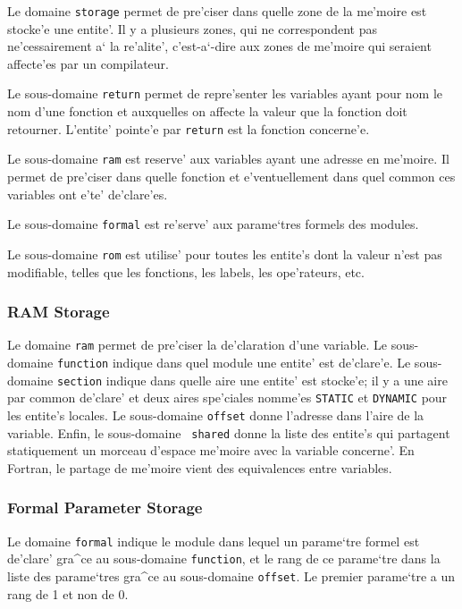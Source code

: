 {
Le domaine \verb/storage/ permet de pre'ciser dans quelle zone de la
me'moire est stocke'e une entite'. Il y a plusieurs zones, qui ne
correspondent pas ne'cessairement a` la re'alite', c'est-a`-dire aux
zones de me'moire qui seraient affecte'es par un compilateur.

Le sous-domaine \verb/return/ permet de repre'senter les variables ayant
pour nom le nom d'une fonction et auxquelles on affecte la valeur que la
fonction doit retourner. L'entite' pointe'e par \verb/return/ est la
fonction concerne'e.

Le sous-domaine \verb/ram/ est reserve' aux variables ayant une adresse
en me'moire. Il permet de pre'ciser dans quelle fonction et
e'ventuellement dans quel common ces variables ont e'te' de'clare'es.

Le sous-domaine \verb/formal/ est re'serve' aux parame`tres formels des
modules.

Le sous-domaine \verb/rom/ est utilise' pour toutes les entite's dont la
valeur n'est pas modifiable, telles que les fonctions, les labels, les
ope'rateurs, etc.
}

\subsubsection{RAM Storage}
\label{subsubsection-ram}

{
Le domaine \verb/ram/ permet de pre'ciser la de'claration d'une
variable. Le sous-domaine \verb/function/ indique dans quel module une
entite' est de'clare'e. Le sous-domaine \verb/section/ indique dans
quelle aire une entite' est stocke'e; il y a une aire par common
de'clare' et deux aires spe'ciales nomme'es \verb/STATIC/ et
\verb/DYNAMIC/ pour les entite's locales. Le sous-domaine \verb/offset/
donne l'adresse dans l'aire de la variable. Enfin, le sous-domaine {\tt
shared} donne la liste des entite's qui partagent statiquement un
morceau d'espace me'moire avec la variable concerne'. En Fortran, le
partage de me'moire vient des equivalences entre variables.  }

\subsubsection{Formal Parameter Storage}
\label{subsubsection-formal}

{
Le domaine \verb/formal/ indique le module dans lequel un parame`tre formel
est de'clare' gra^ce au sous-domaine \verb/function/, et le rang de ce
parame`tre dans la liste des parame`tres gra^ce au sous-domaine
\verb/offset/.
Le premier parame`tre a un rang de 1 et non de 0.
}

